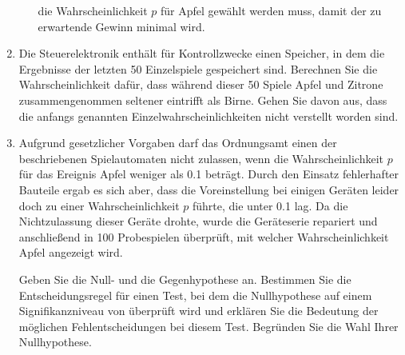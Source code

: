 \begin{exercise}
\begin{enumerate}[1)]
\begin{enumerate}[a)]
                    die Wahrscheinlichkeit $p$ für \glqq Apfel\grqq{}
                    gewählt werden muss, damit der zu erwartende
                    Gewinn minimal wird.
            \end{enumerate}
      \item Die Steuerelektronik enthält für Kontrollzwecke einen
            Speicher, in dem die Ergebnisse der letzten 50 Einzelspiele
            gespeichert sind. Berechnen Sie die Wahrscheinlichkeit dafür,
            dass während dieser 50 Spiele \glqq Apfel\grqq{} und
            \glqq Zitrone\grqq{} zusammengenommen seltener eintrifft als
            \glqq Birne\grqq. Gehen Sie davon aus, dass die anfangs
            genannten Einzelwahrscheinlichkeiten nicht verstellt worden sind.
      \item Aufgrund gesetzlicher Vorgaben darf das Ordnungsamt einen der
            beschriebenen Spielautomaten nicht zulassen, wenn die
            Wahrscheinlichkeit $p$ für das Ereignis \glqq Apfel\grqq{}
            weniger als \num{0.1} beträgt. Durch den Einsatz
            fehlerhafter Bauteile ergab es sich aber, dass die
            Voreinstellung bei einigen Geräten leider doch zu einer
            Wahrscheinlichkeit $p$ führte, die unter \num{0.1} lag.
            Da die Nichtzulassung dieser Geräte drohte, wurde die
            Geräteserie repariert und anschließend in 100 Probespielen
            überprüft, mit welcher Wahrscheinlichkeit \glqq Apfel\grqq{}
            angezeigt wird.\par
            Geben Sie die Null- und die Gegenhypothese an. Bestimmen Sie
            die Entscheidungsregel für einen Test, bei dem die Nullhypothese
            auf einem Signifikanzniveau von  überprüft wird und
            erklären Sie die Bedeutung der möglichen Fehlentscheidungen
            bei diesem Test. Begründen Sie die Wahl Ihrer Nullhypothese.
    \end{enumerate}
  \fi
\end{exercise}
